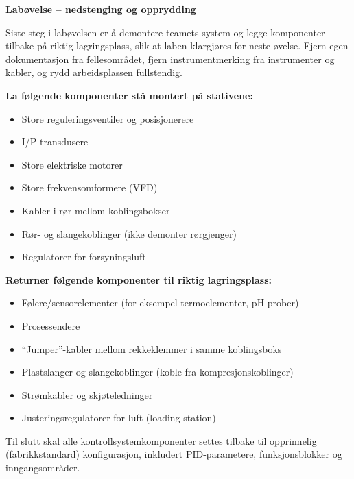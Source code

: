 \vfil \eject

\noindent
{\bf Labøvelse -- nedstenging og opprydding}

\vskip 5pt

Siste steg i labøvelsen er å demontere teamets system og legge komponenter tilbake på riktig lagringsplass, slik at laben klargjøres for neste øvelse. Fjern egen dokumentasjon fra fellesområdet, fjern instrumentmerking fra instrumenter og kabler, og rydd arbeidsplassen fullstendig.

\vskip 10pt

\indent
{\bf La følgende komponenter stå montert på stativene:}

\begin{itemize}
\item{} Store reguleringsventiler og posisjonerere
\item{} I/P-transdusere
\item{} Store elektriske motorer
\item{} Store frekvensomformere (VFD)
\item{} Kabler i rør mellom koblingsbokser
\item{} Rør- og slangekoblinger (ikke demonter rørgjenger)
\item{} Regulatorer for forsyningsluft
\end{itemize}

\vskip 10pt

\indent
{\bf Returner følgende komponenter til riktig lagringsplass:}

\begin{itemize}
\item{} Følere/sensorelementer (for eksempel termoelementer, pH-prober)
\item{} Prosessendere
\item{} ``Jumper''-kabler mellom rekkeklemmer i samme koblingsboks
\item{} Plastslanger og slangekoblinger (koble fra kompresjonskoblinger)
\item{} Strømkabler og skjøteledninger
\item{} Justeringsregulatorer for luft (loading station)
\end{itemize}

\vskip 10pt

Til slutt skal alle kontrollsystemkomponenter settes tilbake til opprinnelig (fabrikkstandard) konfigurasjon, inkludert PID-parametere, funksjonsblokker og inngangsområder.








